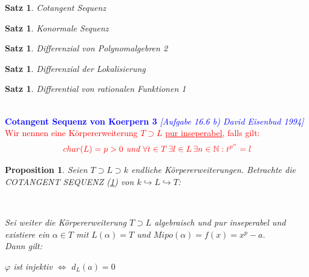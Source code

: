 \documentclass[10pt,a4paper]{report}
\newcommand{\ModulsOfDifferenzials}{David Eisenbud 1994}
\newcounter{Aussage}[chapter]
\newtheorem{satz}[Aussage]{Satz}
\newtheorem{prop}[Aussage]{Proposition}
\newcommand{\divR}[2]{\Omega_{#1/#2}}
\newcommand{\divf}[1]{d_{#1}}
\newcommand{\Tensor}[3]{#1 \otimes_{#2} #3}
\begin{document}
\begin{satz}\label{Cotangent Sequenz}
Cotangent Sequenz
\end{satz}

\begin{satz}\label{Konormale Sequenz}
Konormale Sequenz
\end{satz}

\begin{satz}\label{Differenzial von Polynomalgebren 2}
Differenzial von Polynomalgebren 2
\end{satz}

\begin{satz}\label{Differenzial der Lokalisierung}
Differenzial der Lokalisierung
\end{satz}

\begin{satz}\label{Differential von rationalen Funktionen 1}
Differential von rationalen Funktionen 1
\end{satz}


\ \\
\textcolor{blue}{\textbf{Cotangent Sequenz von Koerpern 3} \textit{[Aufgabe 16.6 b) \ModulsOfDifferenzials]}}
\textcolor{red}{Wir nennen eine Körpererweiterung $T \supset L$ \underline{pur inseperabel}, falls gilt:}
\begin{gather*}
\textcolor{red}{ char(L) = p > 0 \textit{ und } \forall t \in T \, \exists l \in  L \, \exists n \in \mathbb{N} : t^{p^n} = l }
\end{gather*}
\begin{prop}\label{Cotangent Sequenz von Koerpern 3}
Seien $T \supset L \supset k$ endliche Körpererweiterungen. Betrachte die COTANGENT SEQUENZ \textit{(\cref{Cotangent Sequenz})} von $k \hookrightarrow L \hookrightarrow T$:
\begin{center}
\ \\
\end{center}
Sei weiter die Körpererweiterung $T \supset L$ algebraisch und pur inseperabel und existiere ein $\alpha \in T$ mit $L(\alpha) = T$ und $Mipo(\alpha) = f(x) = x^p - a$.\\
Dann gilt:
\begin{center}
$\varphi$ ist injektiv $\Leftrightarrow$ $\divf{L}(a) = 0$
\end{center}
\end{prop}
\end{document}
